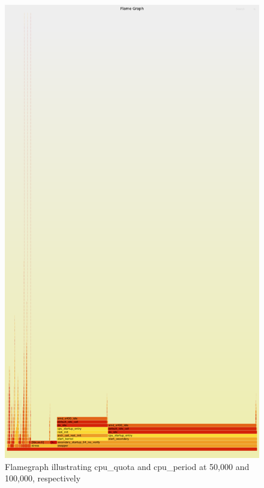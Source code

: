 \documentclass{report}  %
\begin{document}
\begin{figure}[H]
    \centering
    \includegraphics[scale=0.2]{cpu_tricks/6.1.0/V1/flamegraph_20241021_083758.png}
    \caption{Flamegraph illustrating cpu\_quota and cpu\_period at 50,000 and 100,000, respectively}
    \label{fig:flamegraph}
\end{figure}
\end{document}

